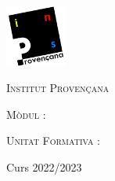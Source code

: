 \begin{titlepage}
	\centering
	\includegraphics*[width=0.15\textwidth]{provencana_color.pdf}
	\par\vspace{0.5cm}

	{\scshape\Large Institut Provençana \par}

	\vspace{1cm}

	{\itshape\Large \acttipus \par}
	{\bfseries\LARGE \actnom \par}
	
	\vspace{1cm}
	
	{\scshape\large Mòdul \modulnum: \par}
	{\scshape\Large \modulnom \par}

	\vspace{1cm}
	
	{\scshape\normalsize Unitat Formativa \ufnum: \par}
	{\scshape\large \ufnom \par}

	\vfill
	{\Large\itshape \autor \par}
	\vfill

	Curs 2022/2023
\end{titlepage}